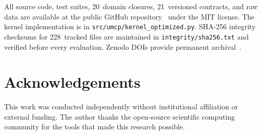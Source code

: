 \documentclass[11pt]{article}
\begin{document}
All source code, test suites, 20~domain closures, 21~versioned
contracts, and raw data are available at the public GitHub
repository~\cite{umcpmetadatarepo} under the MIT license. The
kernel implementation is in
\texttt{src/umcp/kernel\_optimized.py}. SHA-256 integrity checksums
for 228~tracked files are maintained in \texttt{integrity/sha256.txt}
and verified before every evaluation. Zenodo DOIs provide permanent
archival~\cite{paulus2025episteme,
paulus2025physicscoherence, paulus2026umcpcasepack}.

\section*{Acknowledgements}
This work was conducted independently without institutional
affiliation or external funding. The author thanks the open-source
scientific computing community for the tools that made this
research possible.



\end{document}
